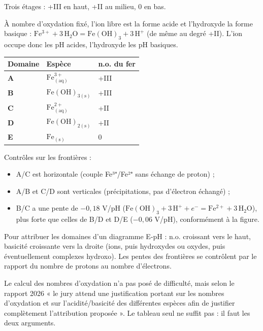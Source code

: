 \documentclass[11pt,a4paper]{article}
\providecommand{\tightlist}{\setlength{\itemsep}{0pt}\setlength{\parskip}{0pt}}
\begin{document}
Trois étages : +III en haut, +II au milieu, 0 en bas.

À nombre d'oxydation fixé, l'ion libre est la forme acide et l'hydroxyde la forme basique : \(\mathrm{Fe^{3+}}+3\,\mathrm{H_2O}=\mathrm{Fe(OH)_3}+3\,\mathrm{H^+}\) (de même au degré +II). L'ion occupe donc les pH acides, l'hydroxyde les pH basiques.

\begin{longtable}[]{@{}lll@{}}
\toprule\noalign{}
Domaine & Espèce & n.o. du fer \\
\midrule\noalign{}
\endhead
\bottomrule\noalign{}
\endlastfoot
\textbf{A} & \(\mathrm{Fe^{3+}_{(aq)}}\) & +III \\
\textbf{B} & \(\mathrm{Fe(OH)_{3(s)}}\) & +III \\
\textbf{C} & \(\mathrm{Fe^{2+}_{(aq)}}\) & +II \\
\textbf{D} & \(\mathrm{Fe(OH)_{2(s)}}\) & +II \\
\textbf{E} & \(\mathrm{Fe_{(s)}}\) & 0 \\
\end{longtable}

Contrôles sur les frontières :

\begin{itemize}
\tightlist
\item
  A/C est horizontale (couple Fe³⁺/Fe²⁺ sans échange de proton) ;
\item
  A/B et C/D sont verticales (précipitations, pas d'électron échangé) ;
\item
  B/C a une pente de \(-0{,}18\) V/pH (\(\mathrm{Fe(OH)_3}+3\,\mathrm{H^+}+e^-=\mathrm{Fe^{2+}}+3\,\mathrm{H_2O}\)), plus forte que celles de B/D et D/E (\(-0{,}06\) V/pH), conformément à la figure.
\end{itemize}

\begin{methode}

Pour attribuer les domaines d'un diagramme E-pH : n.o. croissant vers le haut, basicité croissante vers la droite (ions, puis hydroxydes ou oxydes, puis éventuellement complexes hydroxo). Les pentes des frontières se contrôlent par le rapport du nombre de protons au nombre d'électrons.

\end{methode}

\begin{jury}

Le calcul des nombres d'oxydation n'a pas posé de difficulté, mais selon le rapport 2026 « le jury attend une justification portant sur les nombres d'oxydation et sur l'acidité/basicité des différentes espèces afin de justifier complètement l'attribution proposée ». Le tableau seul ne suffit pas : il faut les deux arguments.

\end{jury}
\end{document}

